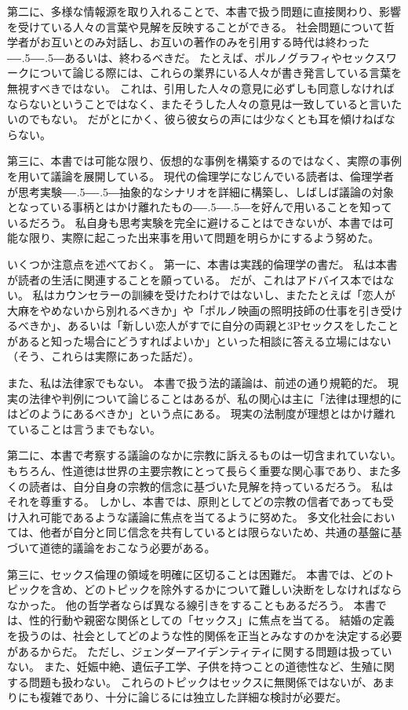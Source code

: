\documentclass[paper=a4,book,openany]{jlreq}
\def\DDASH{―\kern-.5\zw―\kern-.5\zw―} %
\begin{document}
第二に、多様な情報源を取り入れることで、本書で扱う問題に直接関わり、影響を受けている人々の言葉や見解を反映することができる。
社会問題について哲学者がお互いとのみ対話し、お互いの著作のみを引用する時代は終わった{\DDASH}あるいは、終わるべきだ。
たとえば、ポルノグラフィやセックスワークについて論じる際には、これらの業界にいる人々が書き発言している言葉を無視すべきではない。
これは、引用した人々の意見に必ずしも同意しなければならないということではなく、またそうした人々の意見は一致していると言いたいのでもない。
だがとにかく、彼ら彼女らの声には少なくとも耳を傾けねばならない。

第三に、本書では可能な限り、仮想的な事例を構築するのではなく、実際の事例を用いて議論を展開している。
現代の倫理学になじんでいる読者は、倫理学者が思考実験{\DDASH}抽象的なシナリオを詳細に構築し、しばしば議論の対象となっている事柄とはかけ離れたもの{\DDASH}を好んで用いることを知っているだろう。
私自身も思考実験を完全に避けることはできないが、本書では可能な限り、実際に起こった出来事を用いて問題を明らかにするよう努めた。

いくつか注意点を述べておく。
第一に、本書は実践的倫理学の書だ。
私は本書が読者の生活に関連することを願っている。
だが、これはアドバイス本ではない。
私はカウンセラーの訓練を受けたわけではないし、またたとえば「恋人が大麻をやめないから別れるべきか」や「ポルノ映画の照明技師の仕事を引き受けるべきか」、あるいは「新しい恋人がすでに自分の両親と3Pセックスをしたことがあると知った場合にどうすればよいか」といった相談に答える立場にはない（そう、これらは実際にあった話だ\citep{savage21:_mum_dat}）。

また、私は法律家でもない。
本書で扱う法的議論は、前述の通り規範的だ。
現実の法律や判例について論じることはあるが、私の関心は主に「法律は理想的にはどのようにあるべきか」という点にある。
現実の法制度が理想とはかけ離れていることは言うまでもない。

第二に、本書で考察する議論のなかに宗教に訴えるものは一切含まれていない。
もちろん、性道徳は世界の主要宗教にとって長らく重要な関心事であり、また多くの読者は、自分自身の宗教的信念に基づいた見解を持っているだろう。
私はそれを尊重する。
しかし、本書では、原則としてどの宗教の信者であっても受け入れ可能であるような議論に焦点を当てるように努めた。
多文化社会においては、他者が自分と同じ信念を共有しているとは限らないため、共通の基盤に基づいて道徳的議論をおこなう必要がある。

第三に、セックス倫理の領域を明確に区切ることは困難だ。
本書では、どのトピックを含め、どのトピックを除外するかについて難しい決断をしなければならなかった。
他の哲学者ならば異なる線引きをすることもあるだろう。
本書では、性的行動や親密な関係としての「セックス」に焦点を当てる。
結婚の定義を扱うのは、社会としてどのような性的関係を正当とみなすのかを決定する必要があるからだ。
ただし、ジェンダーアイデンティティに関する問題は扱っていない。
また、妊娠中絶、遺伝子工学、子供を持つことの道徳性など、生殖に関する問題も扱わない。
これらのトピックはセックスに無関係ではないが、あまりにも複雑であり、十分に論じるには独立した詳細な検討が必要だ。
\end{document}
